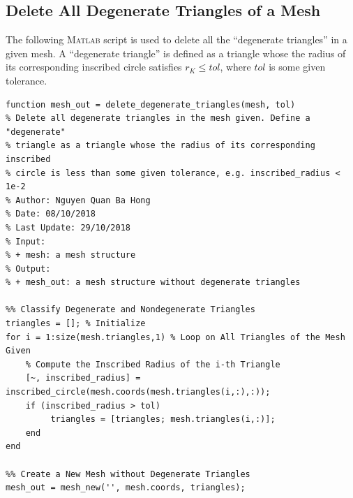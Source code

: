 \documentclass[11pt,a4paper,center,notitlepage]{article}
\numberwithin{equation}{section}
\begin{document}
\subsection{Delete All Degenerate Triangles of a Mesh}
The following \textsc{Matlab} script is used to delete all the ``degenerate triangles'' in a given mesh. A ``degenerate triangle'' is defined as a triangle whose the radius of its corresponding inscribed circle satisfies $r_K \le tol$, where $tol$ is some given tolerance.
\begin{verbatim}
function mesh_out = delete_degenerate_triangles(mesh, tol)
% Delete all degenerate triangles in the mesh given. Define a "degenerate"
% triangle as a triangle whose the radius of its corresponding inscribed
% circle is less than some given tolerance, e.g. inscribed_radius < 1e-2
% Author: Nguyen Quan Ba Hong
% Date: 08/10/2018
% Last Update: 29/10/2018
% Input:
% + mesh: a mesh structure
% Output:
% + mesh_out: a mesh structure without degenerate triangles 

%% Classify Degenerate and Nondegenerate Triangles
triangles = []; % Initialize
for i = 1:size(mesh.triangles,1) % Loop on All Triangles of the Mesh Given
    % Compute the Inscribed Radius of the i-th Triangle
    [~, inscribed_radius] = inscribed_circle(mesh.coords(mesh.triangles(i,:),:));
    if (inscribed_radius > tol) 
         triangles = [triangles; mesh.triangles(i,:)];
    end
end

%% Create a New Mesh without Degenerate Triangles
mesh_out = mesh_new('', mesh.coords, triangles);
\end{verbatim}
\end{document}
